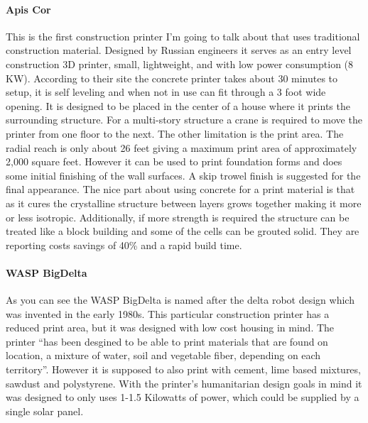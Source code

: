 \documentclass[12pt]{article}
\begin{document}
\paragraph{Apis Cor}
This is the first construction printer I'm going to talk about that uses traditional construction material.  Designed by Russian engineers it serves as an entry level construction 3D printer, small, lightweight, and with low power consumption (8 KW).  According to their site the concrete printer takes about 30 minutes to setup, it is self leveling and when not in use can fit through a 3 foot wide opening.  It is designed to be placed in the center of a house where it prints the surrounding structure.  For a multi-story structure a crane is required to move the printer from one floor to the next.  The other limitation is the print area.  The radial reach is only about 26 feet giving a maximum print area of approximately 2,000 square feet.  However it can be used to print foundation forms and does some initial finishing of the wall surfaces.  A skip trowel finish is suggested for the final appearance.  The nice part about using concrete for a print material is that as it cures the crystalline structure between layers grows together making it more or less isotropic.  Additionally, if more strength is required the structure can be treated like a block building and some of the cells can be grouted solid.  They are reporting costs savings of 40\% and a rapid build time.  
\paragraph{WASP BigDelta}
As you can see the WASP BigDelta is named after the delta robot design which was invented in the early 1980s.  This particular construction printer has a reduced print area, but it was designed with low cost housing in mind.  The printer ``has been desgined to be able to print materials that are found on location, a mixture of water, soil and vegetable fiber, depending on each territory''. However it is supposed to also print with cement, lime based mixtures, sawdust and polystyrene.  With the printer's humanitarian design goals in mind it was designed to only uses 1-1.5 Kilowatts of power, which could be supplied by a single solar panel.
\end{document}
